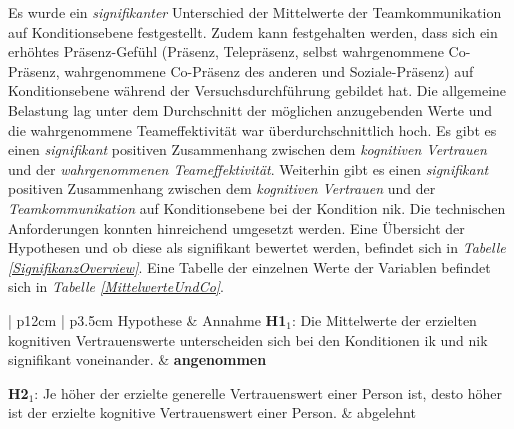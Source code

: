 \documentclass[a4paper,11pt]{article}%
\renewcommand{\\}{\vspace*{0.5\baselineskip} \newline}
\begin{document}
{{Es wurde ein \textit{signifikanter} Unterschied der Mittelwerte der Teamkommunikation auf Konditionsebene festgestellt. Zudem kann festgehalten werden, dass sich ein erhöhtes Präsenz-Gefühl (Präsenz, Telepräsenz, selbst wahrgenommene Co-Präsenz, wahrgenommene Co-Präsenz des anderen und Soziale-Präsenz) auf Konditionsebene während der Versuchsdurchführung gebildet hat. Die allgemeine Belastung lag unter dem Durchschnitt der möglichen anzugebenden Werte und die wahrgenommene Teameffektivität war überdurchschnittlich hoch.
Es gibt es einen \textit{signifikant} positiven Zusammenhang zwischen dem \textit{kognitiven Vertrauen} und der \textit{wahrgenommenen Teameffektivität}. Weiterhin gibt es einen \textit{signifikant} positiven Zusammenhang zwischen dem \textit{kognitiven Vertrauen} und der \textit{Teamkommunikation} auf Konditionsebene bei der Kondition \ac{nik}.
Die technischen Anforderungen konnten hinreichend umgesetzt werden.
Eine Übersicht der Hypothesen und ob diese als signifikant bewertet werden, befindet sich in \textit{Tabelle \ref{SignifikanzOverview}}. Eine Tabelle der einzelnen Werte der Variablen befindet sich in \textit{Tabelle \ref{MittelwerteUndCo}}.

\begin{table}[H]
	\centering\footnotesize{}
	\caption[Annahme und Ablehnung der Hypothesen]{Diese Tabelle zeigt, ob eine Hypothese angenommen oder abgelehnt wurde.}
	\label{SignifikanzOverview}
	\begin{tabularx}{\textwidth}{| p{12cm} | p{3.5cm}} 
		Hypothese & Annahme  \\
		\hline \\
\textbf{H1$_{1}$}: Die Mittelwerte der erzielten kognitiven Vertrauenswerte unterscheiden sich bei den Konditionen \ac{ik} und \ac{nik} signifikant voneinander.\\
		& \textbf{angenommen} \\
		\hline \\
		
				\textbf{H2$_{1}$}: Je höher der erzielte generelle Vertrauenswert einer Person ist, desto höher ist der erzielte kognitive Vertrauenswert einer Person. \\
		& abgelehnt \\
		

\end{tabularx}
\end{table}}}
\end{document}
